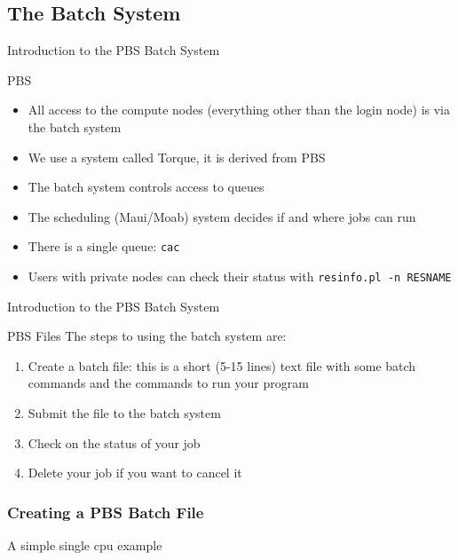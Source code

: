 \documentclass[handout]{beamer}
\begin{document}
  \subsection{The Batch System}
  \begin{frame}{Introduction to the PBS Batch System}
   \begin{block}{PBS}
    \begin{itemize}
    \item All access to the compute nodes (everything other than the login node)
      is via the batch system
    \item We use a system called Torque, it is derived from PBS
    \item The batch system controls access to queues
    \item The scheduling (Maui/Moab) system decides if and where jobs can run
    \item<2-> There is a single queue: \texttt{cac}
    \item<3-> Users with private nodes can check their status with \texttt{resinfo.pl -n RESNAME}
    \end{itemize}
   \end{block}
  \end{frame}
  \begin{frame}{Introduction to the PBS Batch System}
   \begin{block}{PBS Files}
    The steps to using the batch system are:
    \begin{enumerate}
    \item Create a batch file: this is a short (5-15 lines) text file with some
      batch commands and the commands to run your program
    \item Submit the file to the batch system
    \item Check on the status of your job
    \item Delete your job if you want to cancel it
    \end{enumerate}
   \end{block}
  \end{frame}
\begin{frame}[fragile]
  \frametitle{Creating a PBS Batch File}
A simple single cpu example
  \begin{semiverbatim}
  \end{semiverbatim}
\end{frame}
\end{document}
